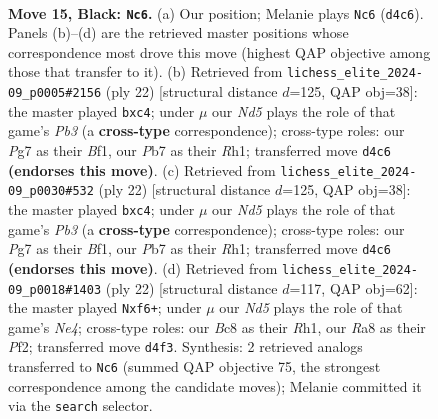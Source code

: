 \documentclass[11pt]{article}
\begin{document}
\clearpage

\begin{figure}[p]\centering
\begin{subfigure}{0.46\textwidth}\centering
\resizebox{\linewidth}{!}{%
\newchessgame
\chessboard[
  setfen={r1bq1k2/pp1n1pp1/4p3/2bpP3/Q2n1P1r/P3B3/1P4PP/R3KNNR b KQ - 4 15},
  showmover=false,
  pgfstyle=straightmove, color=movearrow, markmove={d4-c6}
]}
\caption{}
\end{subfigure}\hfill
\begin{subfigure}{0.46\textwidth}\centering
\resizebox{\linewidth}{!}{%
\newchessgame
\chessboard[
  setfen={rn1qk2r/1b3ppp/4pn2/pp6/2pP4/1P2PN2/1B3PPP/R2QKB1R w KQkq - 3 12},
  showmover=false,
  pgfstyle=straightmove, color=movearrow, markmove={b3-c4}
]}
\caption{}
\end{subfigure}
\\[4pt]
\begin{subfigure}{0.46\textwidth}\centering
\resizebox{\linewidth}{!}{%
\newchessgame
\chessboard[
  setfen={rn1qk2r/1b3ppp/4pn2/pp6/2pP4/1P2PN2/1B3PPP/R2QKB1R w KQkq - 3 12},
  showmover=false,
  pgfstyle=straightmove, color=movearrow, markmove={b3-c4}
]}
\caption{}
\end{subfigure}\hfill
\begin{subfigure}{0.46\textwidth}\centering
\resizebox{\linewidth}{!}{%
\newchessgame
\chessboard[
  setfen={r1b1kb1r/2p2ppp/p4n2/3qp1N1/1p2N3/1P1P4/1PP2PPP/R1BQK2R w KQkq - 0 12},
  showmover=false,
  pgfstyle=straightmove, color=movearrow, markmove={e4-f6}
]}
\caption{}
\end{subfigure}
\caption{\textbf{Move 15, Black: \texttt{Nc6}.} (a) Our position; Melanie plays \texttt{Nc6} (\texttt{d4c6}). Panels (b)--(d) are the retrieved master positions whose correspondence most drove this move (highest QAP objective among those that transfer to it). (b) Retrieved from \texttt{lichess\_elite\_2024-09\_p0005\#2156} (ply 22) [structural distance $d$=125, QAP obj=38]: the master played \texttt{bxc4}; under $\mu$ our \emph{Nd5} plays the role of that game's \emph{Pb3} (a \textbf{cross-type} correspondence); cross-type roles: our \emph{P}g7 as their \emph{B}f1, our \emph{P}b7 as their \emph{R}h1; transferred move \texttt{d4c6} \textbf{(endorses this move)}. (c) Retrieved from \texttt{lichess\_elite\_2024-09\_p0030\#532} (ply 22) [structural distance $d$=125, QAP obj=38]: the master played \texttt{bxc4}; under $\mu$ our \emph{Nd5} plays the role of that game's \emph{Pb3} (a \textbf{cross-type} correspondence); cross-type roles: our \emph{P}g7 as their \emph{B}f1, our \emph{P}b7 as their \emph{R}h1; transferred move \texttt{d4c6} \textbf{(endorses this move)}. (d) Retrieved from \texttt{lichess\_elite\_2024-09\_p0018\#1403} (ply 22) [structural distance $d$=117, QAP obj=62]: the master played \texttt{Nxf6+}; under $\mu$ our \emph{Nd5} plays the role of that game's \emph{Ne4}; cross-type roles: our \emph{B}c8 as their \emph{R}h1, our \emph{R}a8 as their \emph{P}f2; transferred move \texttt{d4f3}. Synthesis: 2 retrieved analogs transferred to \texttt{Nc6} (summed QAP objective 75, the strongest correspondence among the candidate moves); Melanie committed it via the \texttt{search} selector.}
\label{fig:thought-m29}
\end{figure}
\end{document}
